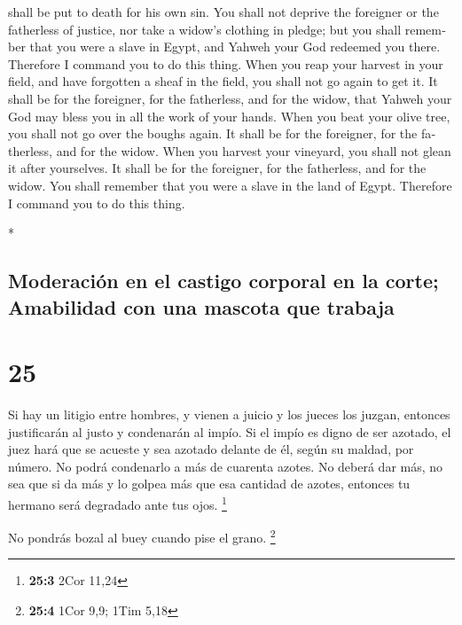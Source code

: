 \begin{paracol}{2}
\begin{otherlanguage}{english}
shall be put to death for his own sin.  You shall not
deprive the foreigner or the fatherless of justice, nor take a widow's
clothing in pledge;  but you shall remember that you were
a slave in Egypt, and Yahweh your God redeemed you there. Therefore I
command you to do this thing.  When you reap your harvest
in your field, and have forgotten a sheaf in the field, you shall not go
again to get it. It shall be for the foreigner, for the fatherless, and
for the widow, that Yahweh your God may bless you in all the work of
your hands.  When you beat your olive tree, you shall not
go over the boughs again. It shall be for the foreigner, for the
fatherless, and for the widow.  When you harvest your
vineyard, you shall not glean it after yourselves. It shall be for the
foreigner, for the fatherless, and for the widow.  You
shall remember that you were a slave in the land of Egypt. Therefore I
command you to do this thing.

\end{otherlanguage}

\switchcolumn[0]*

\hypertarget{moderaciuxf3n-en-el-castigo-corporal-en-la-corte-amabilidad-con-una-mascota-que-trabaja}{%
\subsection{Moderación en el castigo corporal en la corte; Amabilidad
con una mascota que
trabaja}\label{moderaciuxf3n-en-el-castigo-corporal-en-la-corte-amabilidad-con-una-mascota-que-trabaja}}

\hypertarget{section-48}{%
\section{25}\label{section-48}}

 Si hay un litigio entre hombres, y vienen a juicio y los
jueces los juzgan, entonces justificarán al justo y condenarán al impío.
 Si el impío es digno de ser azotado, el juez hará que se
acueste y sea azotado delante de él, según su maldad, por número.
 No podrá condenarlo a más de cuarenta azotes. No deberá
dar más, no sea que si da más y lo golpea más que esa cantidad de
azotes, entonces tu hermano será degradado ante tus ojos. \footnote{\textbf{25:3}
  2Cor 11,24}

 No pondrás bozal al buey cuando pise el grano.
\footnote{\textbf{25:4} 1Cor 9,9; 1Tim 5,18}


\end{paracol}
